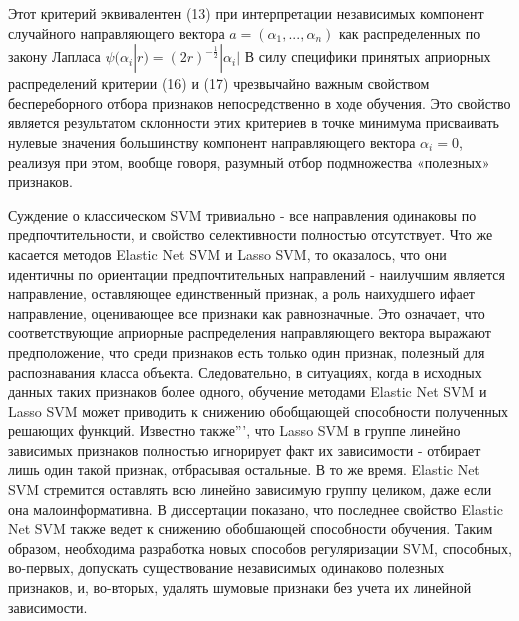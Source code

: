 \documentclass[../body.tex]{subfiles}
\begin{document}
	Этот критерий эквивалентен (13) при интерпретации независимых компонент случайного
	направляющего вектора $a=(\alpha_1, ..., \alpha_n)$ как распределенных по закону Лапласа $\psi(\alpha_i|r) = (2r)^{-\frac{1}{2}}|\alpha_i|$
	В силу специфики принятых априорных распределений критерии (16) и (17) чрезвычайно важным свойством беспереборного отбора признаков непосредственно в ходе обучения. Это свойство является результатом
	склонности этих критериев в точке минимума присваивать нулевые значения большинству
	компонент направляющего вектора $\alpha_i = 0$, реализуя при этом, вообще говоря, разумный
	отбор подмножества «полезных» признаков. 
	
	Суждение о классическом SVM тривиально - все направления одинаковы по предпочтительности, и свойство селективности полностью отсутствует. Что же касается методов
	Elastic Net SVM и Lasso SVM, то оказалось, что они идентичны по ориентации предпочтительных направлений - наилучшим является направление, оставляющее единственный
	признак, а роль наихудшего ифает направление, оценивающее все признаки как равнозначные. Это означает, что соответствующие априорные распределения направляющего
	вектора выражают предположение, что среди признаков есть только один признак, полезный для распознавания класса объекта. Следовательно, в ситуациях, когда в исходных
	данных таких признаков более одного, обучение методами Elastic Net SVM и Lasso SVM
	может приводить к снижению обобщающей способности полученных решающих функций.
	Известно также''', что Lasso SVM в группе линейно зависимых признаков полностью
	игнорирует факт их зависимости - отбирает лишь один такой признак, отбрасывая остальные. В то же время. Elastic Net SVM стремится оставлять всю линейно зависимую группу
	целиком, даже если она малоинформативна. В диссертации показано, что последнее свойство Elastic Net SVM также ведет к снижению обобшающей способности обучения.
	Таким образом, необходима разработка новых способов регуляризации SVM, способных, во-первых, допускать существование независимых одинаково полезных признаков, и,
	во-вторых, удалять шумовые признаки без учета их линейной зависимости. 
	\\
	
\end{document}
